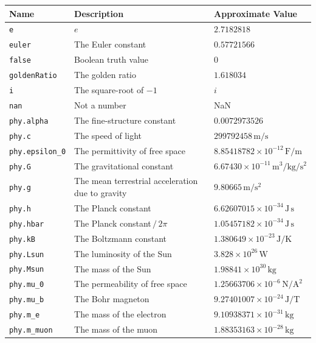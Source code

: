 \begin{landscape}
\begin{center}
\begin{longtable}{|lll|}
\hline \endfoot
\hline
{\bf Name} & {\bf Description} & {\bf Approximate Value} \\ \hline \endhead
{\tt e} & $e$ & $2.7182818$ \\
{\tt euler} & The Euler constant & $0.57721566$ \\
{\tt false} & Boolean truth value & 0 \\
{\tt goldenRatio} & The golden ratio & $1.618034$ \\
{\tt i} & The square-root of $-1$ & $i$ \\
{\tt nan} & Not a number & NaN \\
{\tt phy.alpha} & The fine-structure constant & $0.0072973526$ \\
{\tt phy.c} & The speed of light & $299792458\,\mathrm{m}/\mathrm{s}$ \\
{\tt phy.epsilon\_0} & The permittivity of free space & $8.85418782\times10^{-12}\,\mathrm{F}/\mathrm{m}$ \\
{\tt phy.G} & The gravitational constant & $6.67430\times10^{-11}\,\mathrm{m}^3/\mathrm{kg}/\mathrm{s}^{2}$ \\
{\tt phy.g} & The mean terrestrial acceleration due to gravity & $9.80665\,\mathrm{m}/\mathrm{s}^{2}$ \\
{\tt phy.h} & The Planck constant & $6.62607015\times10^{-34}\,\mathrm{J}\,\mathrm{s}$ \\
{\tt phy.hbar} & The Planck constant$\,/\,2\pi$ & $1.05457182\times10^{-34}\,\mathrm{J}\,\mathrm{s}$ \\
{\tt phy.kB} & The Boltzmann constant & $1.380649\times10^{-23}\,\mathrm{J}/\mathrm{K}$ \\
{\tt phy.Lsun} & The luminosity of the Sun & $3.828\times10^{26}\,\mathrm{W}$ \\
{\tt phy.Msun} & The mass of the Sun & $1.98841\times10^{30}\,\mathrm{kg}$ \\
{\tt phy.mu\_0} & The permeability of free space & $1.25663706\times10^{-6}\,\mathrm{N}/\mathrm{A}^{2}$ \\
{\tt phy.mu\_b} & The Bohr magneton & $9.27401007\times10^{-24}\,\mathrm{J}/\mathrm{T}$ \\
{\tt phy.m\_e} & The mass of the electron & $9.10938371\times10^{-31}\,\mathrm{kg}$ \\
{\tt phy.m\_muon} & The mass of the muon & $1.88353163\times10^{-28}\,\mathrm{kg}$ \\

\end{longtable}
\end{center}
\end{landscape}
